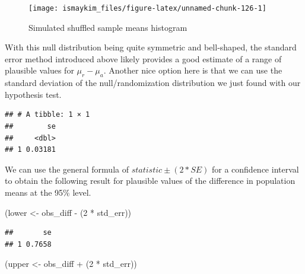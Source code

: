 \documentclass[]{tufte-book}
\newenvironment{Shaded}{\begin{snugshade}}{\end{snugshade}}
\newcommand{\KeywordTok}[1]{\textcolor[rgb]{0.13,0.29,0.53}{\textbf{{#1}}}}
\newcommand{\DataTypeTok}[1]{\textcolor[rgb]{0.13,0.29,0.53}{{#1}}}
\newcommand{\DecValTok}[1]{\textcolor[rgb]{0.00,0.00,0.81}{{#1}}}
\newcommand{\StringTok}[1]{\textcolor[rgb]{0.31,0.60,0.02}{{#1}}}
\newcommand{\NormalTok}[1]{{#1}}
\begin{document}
\begin{figure}

{\centering \texttt{[image: ismaykim\_files/figure-latex/unnamed-chunk-126-1]} 

}

\caption[Simulated shuffled sample means histogram]{Simulated shuffled sample means histogram}\label{fig:unnamed-chunk-126}
\end{figure}

With this null distribution being quite symmetric and bell-shaped, the
standard error method introduced above likely provides a good estimate
of a range of plausible values for \(\mu_r - \mu_a\). Another nice
option here is that we can use the standard deviation of the
null/randomization distribution we just found with our hypothesis test.

\begin{Shaded}
\end{Shaded}

\begin{verbatim}
## # A tibble: 1 × 1
##        se
##     <dbl>
## 1 0.03181
\end{verbatim}

We can use the general formula of \(statistic \pm (2 * SE)\) for a
confidence interval to obtain the following result for plausible values
of the difference in population means at the 95\% level.

\begin{Shaded}
\begin{Highlighting}[]
\NormalTok{(lower <-}\StringTok{ }\NormalTok{obs_diff -}\StringTok{ }\NormalTok{(}\DecValTok{2} \NormalTok{*}\StringTok{ }\NormalTok{std_err))}
\end{Highlighting}
\end{Shaded}

\begin{verbatim}
##       se
## 1 0.7658
\end{verbatim}

\begin{Shaded}
\begin{Highlighting}[]
\NormalTok{(upper <-}\StringTok{ }\NormalTok{obs_diff +}\StringTok{ }\NormalTok{(}\DecValTok{2} \NormalTok{*}\StringTok{ }\NormalTok{std_err))}
\end{Highlighting}
\end{Shaded}
\end{document}

